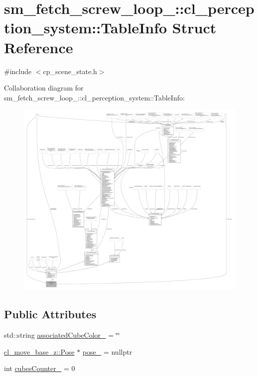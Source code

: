 \hypertarget{structsm__fetch__screw__loop__1_1_1cl__perception__system_1_1TableInfo}{}\section{sm\+\_\+fetch\+\_\+screw\+\_\+loop\+\_\+:\+:cl\+\_\+perception\+\_\+system\+:\+:Table\+Info Struct Reference}
\label{structsm__fetch__screw__loop__1_1_1cl__perception__system_1_1TableInfo}


{\ttfamily \#include $<$cp\+\_\+scene\+\_\+state.\+h$>$}



Collaboration diagram for sm\+\_\+fetch\+\_\+screw\+\_\+loop\+\_\+:\+:cl\+\_\+perception\+\_\+system\+:\+:Table\+Info\+:
\nopagebreak
\begin{figure}[H]
\begin{center}
\leavevmode
\includegraphics[width=350pt]{structsm__fetch__screw__loop__1_1_1cl__perception__system_1_1TableInfo__coll__graph}
\end{center}
\end{figure}
\subsection*{Public Attributes}
\begin{DoxyCompactItemize}
\item 
std\+::string \hyperlink{structsm__fetch__screw__loop__1_1_1cl__perception__system_1_1TableInfo_abdff336311d6c6597e65123a669347e3}{associated\+Cube\+Color\+\_\+} = \char`\"{}\char`\"{}
\item 
\hyperlink{classcl__move__base__z_1_1Pose}{cl\+\_\+move\+\_\+base\+\_\+z\+::\+Pose} $\ast$ \hyperlink{structsm__fetch__screw__loop__1_1_1cl__perception__system_1_1TableInfo_a09e74aceb68de28b3b8fa46d30a68f4a}{pose\+\_\+} = nullptr
\item 
int \hyperlink{structsm__fetch__screw__loop__1_1_1cl__perception__system_1_1TableInfo_a9d5d5d72955a9781841a995829655d3a}{cubes\+Counter\+\_\+} = 0
\end{DoxyCompactItemize}


